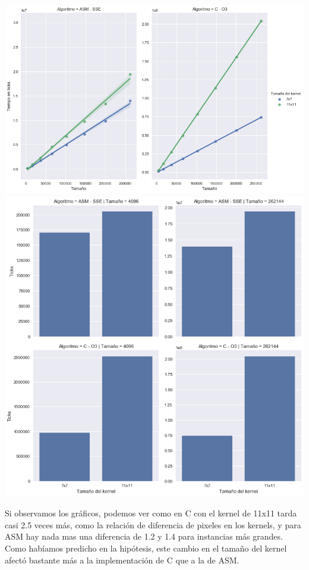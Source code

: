 \begin{center} 
	\includegraphics[scale=0.5]{img/maxCloser_KERNEL.png}
	\includegraphics[scale=0.5]{img/maxCloser_KERNEL_bars.png}
\end{center}

Si observamos los gráficos, podemos ver como en C con el kernel de 11x11 tarda casi 2.5 veces más, como la relación de diferencia de pixeles en los kernels, y para ASM hay nada mas una diferencia de 1.2 y 1.4 para instancias más grandes. Como habíamos predicho en la hipótesis, este cambio en el tamaño del kernel afectó bastante más a la implementación de C que a la de ASM.

